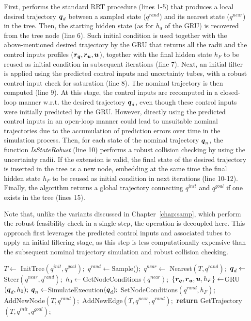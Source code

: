 First,  performs the standard RRT procedure (lines 1-5) that produces a local desired trajectory $\boldsymbol{q}_d$ between a sampled state (${q}^{rand}$) and its nearest state (${q}^{near}$) in the tree. 
Then, the starting hidden state (as for $h_{0}$ of the GRU) is recovered from the tree node (line 6).
Such initial condition is used together with the above-mentioned desired trajectory by the GRU that returns all the radii and the control inputs profiles ($\boldsymbol{r_q},\boldsymbol{r_u},\boldsymbol{u}$), together with the final hidden state $h_{F}$ to be reused as initial condition in subsequent iterations (line 7).
Next, an initial filter is applied using the predicted control inputs and uncertainty tubes, with a robust control input check for saturation (line 8).
The nominal trajectory is then computed (line 9). 
At this stage, the control inputs are recomputed in a closed-loop manner w.r.t. the desired trajectory $\boldsymbol{q}_d$, even though these control inputs were initially predicted by the GRU.
However, directly using the predicted control inputs in an open-loop manner could lead to unsuitable nominal trajectories due to the accumulation of prediction errors over time in the simulation process.
Then, for each state of the nominal trajectory $\boldsymbol{q}_{n}$, the function \emph{IsStateRobust} (line 10) performs a robust collision checking by using the uncertainty radii.
If the extension is valid, the final state of the desired trajectory is inserted in the tree as a new node, embedding at the same time the final hidden state $h_{F}$ to be reused as initial condition in next iterations (line 10-12).
Finally, the algorithm returns a global trajectory connecting ${q}^{init}$ and ${q}^{goal}$ if one exists in the tree (lines 15).

Note that, unlike the  variants discussed in Chapter~\ref{chap:samp}, which perform the robust feasibility check in a single step, the operation is decoupled here. 
This approach first leverages the predicted control inputs and associated tubes to apply an initial filtering stage, as this step is less computationally expensive than the subsequent nominal trajectory simulation and robust collision checking.

\begin{algorithm}[t]
\caption{ [$q^{init}, q^{goal}$]}\label{alg:ExtensionExample}
\begin{algorithmic}[1]
\State $T \gets$ InitTree$({q^{init}, q^{goal}});$
    \State ${q^{rand}} \gets $Sample()$;$
    \State ${q^{near}} \gets$ Nearest$(T,{q^{rand}});$
    \State $\boldsymbol{q}_d \gets$ Steer$({q^{near}},{q^{rand}});$
    \State $h_{0} \gets $GetNodeConditions$({q^{near}});$
    \State $\left \{\boldsymbol{r_q},\boldsymbol{r_u},\boldsymbol{u}, h_{F} \right \} \gets $GRU$(\boldsymbol{q}_d,h_{0});$
        \State $\boldsymbol{q}_{n} \gets $SimulateExecution$(\boldsymbol{q}_d);$
                \State SetNodeConditions$({q^{rand}}, h_{F});$
                \State AddNewNode$(T, {q^{rand}});$
                \State AddNewEdge$(T, {q^{near}}, {q^{rand}});$
        \EndIf
    \EndIf
\EndWhile
\State \textbf{return} GetTrajectory$(T, q^{init}, q^{goal})$;
\end{algorithmic}
\end{algorithm}

